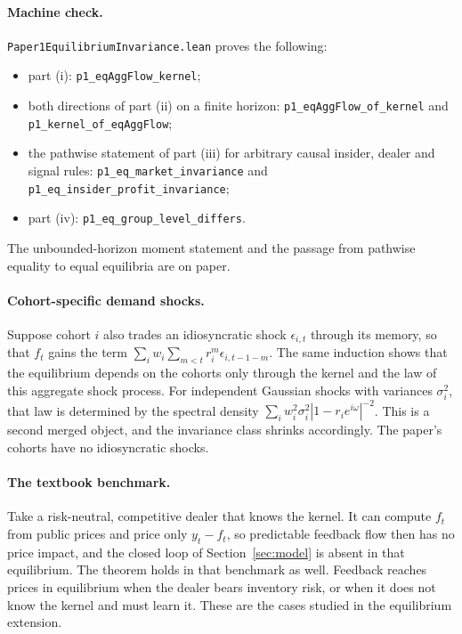 \documentclass[12pt]{article}
\theoremstyle{definition}
\theoremstyle{remark}
\begin{document}
\paragraph{Machine check.} \nolinkurl{Paper1EquilibriumInvariance.lean} proves the following:
\begin{itemize}[itemsep=1pt,topsep=2pt]
\item part (i): \texttt{p1\_eqAggFlow\_kernel};
\item both directions of part (ii) on a finite horizon: \texttt{p1\_eqAggFlow\_of\_kernel} and \texttt{p1\_kernel\_of\_eqAggFlow};
\item the pathwise statement of part (iii) for arbitrary causal insider, dealer and signal rules: \texttt{p1\_eq\_market\_invariance} and \texttt{p1\_eq\_insider\_profit\_invariance};
\item part (iv): \texttt{p1\_eq\_group\_level\_differs}.
\end{itemize}
The unbounded-horizon moment statement and the passage from pathwise equality to equal equilibria are on paper.

\paragraph{Cohort-specific demand shocks.} Suppose cohort $i$ also trades an idiosyncratic shock $\epsilon_{i,t}$ through its memory, so that $f_t$ gains the term $\sum_iw_i\sum_{m<t}r_i^m\epsilon_{i,t-1-m}$. The same induction shows that the equilibrium depends on the cohorts only through the kernel and the law of this aggregate shock process. For independent Gaussian shocks with variances $\sigma_i^2$, that law is determined by the spectral density $\sum_iw_i^2\sigma_i^2|1-r_ie^{i\omega}|^{-2}$. This is a second merged object, and the invariance class shrinks accordingly. The paper's cohorts have no idiosyncratic shocks.

\paragraph{The textbook benchmark.} Take a risk-neutral, competitive dealer that knows the kernel. It can compute $f_t$ from public prices and price only $y_t-f_t$, so predictable feedback flow then has no price impact, and the closed loop of Section~\ref{sec:model} is absent in that equilibrium. The theorem holds in that benchmark as well. Feedback reaches prices in equilibrium when the dealer bears inventory risk, or when it does not know the kernel and must learn it. These are the cases studied in the equilibrium extension.
\end{document}
